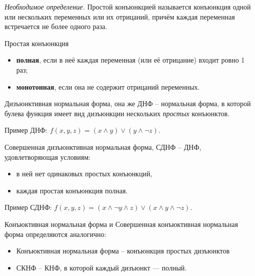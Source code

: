 \documentclass[a4paper,12pt]{article}
\begin{document}
\begin{enumerate}
        \textit {Необходимое определение.} Простой конъюнкцией называется конъюнкция одной или нескольких переменных или их отрицаний, причём каждая переменная встречается не более одного раза.

        Простая конъюнкция
        \begin{itemize}
                \item \textbf{полная}, если в неё каждая переменная (или её отрицание) входит ровно 1 раз;
                \item \textbf{монотонная}, если она не содержит отрицаний переменных.
        \end{itemize}

        Дизъюнктивная нормальная форма, она же ДНФ -- нормальная форма, в которой булева функция имеет вид дизъюнкции нескольких \textit{простых} конъюнктов.

        Пример ДНФ: $f(x,y,z) = (x \land y) \lor (y \land \neg {z})$.

        Совершенная дизъюнктивная нормальная форма, СДНФ -- ДНФ, удовлетворяющая условиям:
        \begin{itemize}
                \item в ней нет одинаковых простых конъюнкций,
                \item каждая простая конъюнкция полная.
        \end{itemize}

        Пример СДНФ: $f(x,y,z) = (x \land \neg {y} \land z) \lor (x \land y \land \neg {z})$.

        Конъюктивная нормальная форма и Совершенная конъюктивная нормальная форма определяются аналогично:
        \begin{itemize}
            \item Конъюктивная нормальная форма -- конъюнкция простых дизъюнктов
            \item СКНФ -- КНФ, в которой каждый дизъюнкт --- полный.
        \end{itemize}


\end{enumerate}
\end{document}
